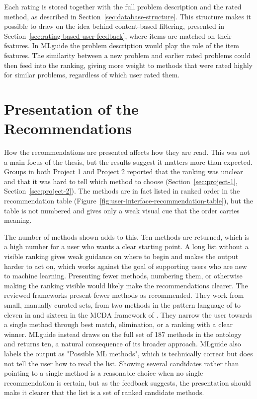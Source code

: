 Each rating is stored together with the full problem description and
the rated method, as described in Section~\ref{sec:database-structure}.
This structure makes it possible to draw on the idea behind
content-based filtering, presented in
Section~\ref{sec:rating-based-user-feedback}, where items are matched
on their features. In MLguide the problem
description would play the role of the item features. The similarity
between a new problem and earlier rated problems could then feed into
the ranking, giving more weight to methods that were rated highly for
similar problems, regardless of which user rated them.

\section{Presentation of the Recommendations}
\label{sec:presentation-of-the-recommendations}

How the recommendations are presented affects how they are read.
This was not a main focus of the thesis, but the results suggest 
it matters more than expected. Groups in both Project 1 and 
Project 2 reported that the ranking was unclear and that it was 
hard to tell which method to choose 
(Section~\ref{sec:project-1}, Section~\ref{sec:project-2}). The 
methods are in fact listed in ranked order in the recommendation 
table (Figure~\ref{fig:user-interface-recommendation-table}), 
but the table is not numbered and gives only a weak visual 
cue that the order carries meaning.

The number of methods shown adds to this. Ten methods are returned, 
which is a high number for a user who wants a clear starting point. A 
long list without a visible ranking gives weak guidance on where to 
begin and makes the output harder to act on, which works against the 
goal of supporting users who are new to machine learning. Presenting 
fewer methods, numbering them, or otherwise making the ranking 
visible would likely make the recommendations clearer. 
The reviewed frameworks present fewer methods as recommended. 
They work from small, manually curated sets, from two methods in 
the pattern language of 
\textcite{sonntag2023pattern_ml_product_development} to eleven 
in \textcite{riesener2020} and sixteen in the MCDA framework of 
\textcite{sonntag2024_mcda_framework}. They narrow the user 
towards a single method through best match, elimination, or a 
ranking with a clear winner. MLguide instead draws on the full 
set of 187 methods in the ontology and returns ten,
a natural consequence of its broader approach. MLguide also labels 
the output as "Possible ML methods", which 
is technically correct but does not tell the user how to read 
the list. 
Showing several candidates rather than pointing to a 
single method is a reasonable choice when no single recommendation is certain,
but as the feedback suggests, 
the presentation should make it clearer that the list is a set of 
ranked candidate methods.

